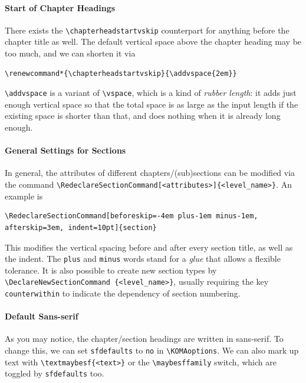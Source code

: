 \paragraph{Start of Chapter Headings}
There exists the \texttt{\textbackslash chapterheadstartvskip} counterpart for anything before the chapter title as well. The default vertical space above the chapter heading may be too much, and we can shorten it via 
\begin{lstlisting}
\renewcommand*{\chapterheadstartvskip}{\addvspace{2em}}    
\end{lstlisting}
\texttt{\textbackslash addvspace} is a variant of \texttt{\textbackslash vspace}, which is a kind of \textit{rubber length}: it adds just enough vertical space so that the total space is as large as the input length if the existing space is shorter than that, and does nothing when it is already long enough.

\paragraph{General Settings for Sections} In general, the attributes of different chapters/(sub)sections can be modified via the command \texttt{\textbackslash RedeclareSection\allowbreak Command[<attributes>]\{<level\_name>\}}. An example is
\begin{lstlisting}
\RedeclareSectionCommand[beforeskip=-4em plus-1em minus-1em, afterskip=3em, indent=10pt]{section}    
\end{lstlisting}
This modifies the vertical spacing before and after every section title, as well as the indent. The \texttt{plus} and \texttt{minus} words stand for a \textit{glue} that allows a flexible tolerance. It is also possible to create new section types by \texttt{\textbackslash DeclareNewSectionCommand \allowbreak[<attributes>]\{<level\_name>\}}, usually requiring the key \texttt{counterwithin} to indicate the dependency of section numbering.

\paragraph{Default Sans-serif} As you may notice, the chapter/section headings are written in sans-serif. To change this, we can set \texttt{sfdefaults} to \texttt{no} in \texttt{\textbackslash KOMAoptions}. We can also mark up text with \texttt{\textbackslash textmaybesf\{<text>\}} or the \texttt{\textbackslash maybesf\allowbreak family} switch, which are toggled by \texttt{sfdefaults} too.

